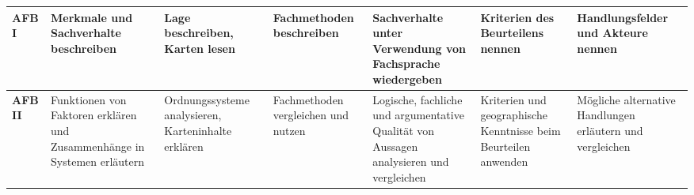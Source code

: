 \begin{landscape}
\begin{table}[H]
\begin{tabular}{>{\bfseries}p{2.5cm} | p{3cm} p{3cm} p{3cm} p{3cm} p{3cm} p{3cm}}
      AFB I                                                                                                &
      Merkmale und Sachverhalte beschreiben                                                                &
      Lage beschreiben, Karten lesen                                                                       &
      Fachmethoden beschreiben                                                                             &
      Sachverhalte unter Verwendung von Fachsprache wiedergeben                                            &
      Kriterien des Beurteilens nennen                                                                     &
      Handlungsfelder und Akteure nennen                                                                                                                                                                                                                                                     \\

      \midrule

      AFB II                                                                                               &
      Funktionen von Faktoren erklären und Zusammenhänge in Systemen erläutern                             &
      Ordnungssysteme analysieren, Karteninhalte erklären                                                  &
      Fachmethoden vergleichen und nutzen                                                                  &
      Logische, fachliche und argumentative Qualität von Aussagen analysieren und vergleichen              &
      Kriterien und geographische Kenntnisse beim Beurteilen anwenden                                      &
      Mögliche alternative Handlungen erläutern und vergleichen                                                                                                                                                                                                                              \\

      \midrule


\end{tabular}
\end{table}
\end{landscape}
